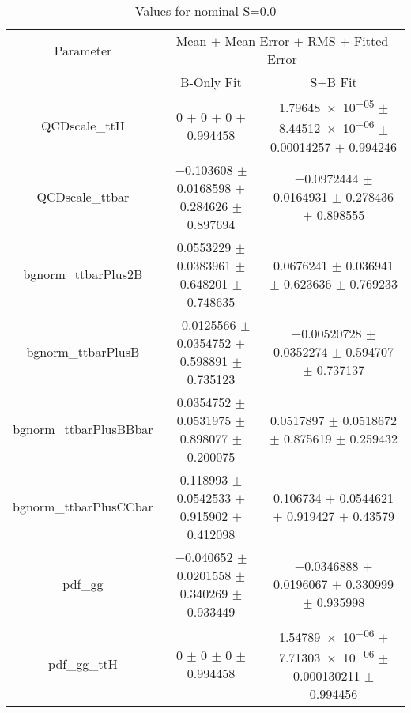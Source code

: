 \begin{table}
\centering
\caption{Values for nominal S=0.0}
\begin{tabular}{ccc}
\toprule
Parameter & \multicolumn{2}{c}{Mean $\pm$ Mean Error $\pm$ RMS $\pm$ Fitted Error}\\
 & B-Only Fit & S+B Fit\\
\midrule
QCDscale\_ttH & \num{0} $\pm$ \num{0} $\pm$ \num{0} $\pm$ \num{0.994458} & \num{1.79648e-05} $\pm$ \num{8.44512e-06} $\pm$ \num{0.00014257} $\pm$ \num{0.994246}\\
QCDscale\_ttbar & \num{-0.103608} $\pm$ \num{0.0168598} $\pm$ \num{0.284626} $\pm$ \num{0.897694} & \num{-0.0972444} $\pm$ \num{0.0164931} $\pm$ \num{0.278436} $\pm$ \num{0.898555}\\
bgnorm\_ttbarPlus2B & \num{0.0553229} $\pm$ \num{0.0383961} $\pm$ \num{0.648201} $\pm$ \num{0.748635} & \num{0.0676241} $\pm$ \num{0.036941} $\pm$ \num{0.623636} $\pm$ \num{0.769233}\\
bgnorm\_ttbarPlusB & \num{-0.0125566} $\pm$ \num{0.0354752} $\pm$ \num{0.598891} $\pm$ \num{0.735123} & \num{-0.00520728} $\pm$ \num{0.0352274} $\pm$ \num{0.594707} $\pm$ \num{0.737137}\\
bgnorm\_ttbarPlusBBbar & \num{0.0354752} $\pm$ \num{0.0531975} $\pm$ \num{0.898077} $\pm$ \num{0.200075} & \num{0.0517897} $\pm$ \num{0.0518672} $\pm$ \num{0.875619} $\pm$ \num{0.259432}\\
bgnorm\_ttbarPlusCCbar & \num{0.118993} $\pm$ \num{0.0542533} $\pm$ \num{0.915902} $\pm$ \num{0.412098} & \num{0.106734} $\pm$ \num{0.0544621} $\pm$ \num{0.919427} $\pm$ \num{0.43579}\\
pdf\_gg & \num{-0.040652} $\pm$ \num{0.0201558} $\pm$ \num{0.340269} $\pm$ \num{0.933449} & \num{-0.0346888} $\pm$ \num{0.0196067} $\pm$ \num{0.330999} $\pm$ \num{0.935998}\\
pdf\_gg\_ttH & \num{0} $\pm$ \num{0} $\pm$ \num{0} $\pm$ \num{0.994458} & \num{1.54789e-06} $\pm$ \num{7.71303e-06} $\pm$ \num{0.000130211} $\pm$ \num{0.994456}\\
\bottomrule
\end{tabular}
\end{table}